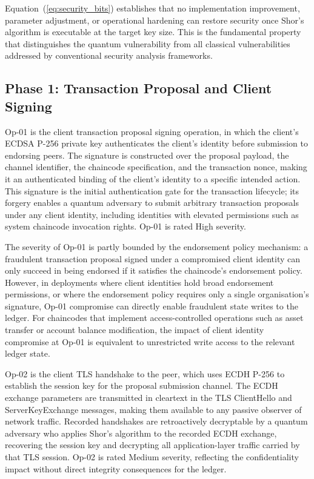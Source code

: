 \documentclass[conference]{IEEEtran}
\begin{document}
Equation~(\ref{eq:security_bits}) establishes that no implementation improvement,
parameter adjustment, or operational hardening can restore security once
Shor's algorithm is executable at the target key size. This is the fundamental
property that distinguishes the quantum vulnerability from all classical
vulnerabilities addressed by conventional security analysis frameworks.

\subsection{Phase 1: Transaction Proposal and Client Signing}

Op-01 is the client transaction proposal signing operation, in which
the client's ECDSA P-256 private key authenticates the client's identity
before submission to endorsing peers. The signature is constructed over
the proposal payload, the channel identifier, the chaincode specification,
and the transaction nonce, making it an authenticated binding of the
client's identity to a specific intended action. This signature is the
initial authentication gate for the transaction lifecycle; its forgery
enables a quantum adversary to submit arbitrary transaction proposals
under any client identity, including identities with elevated permissions
such as system chaincode invocation rights. Op-01 is rated High severity.

The severity of Op-01 is partly bounded by the endorsement policy
mechanism: a fraudulent transaction proposal signed under a compromised
client identity can only succeed in being endorsed if it satisfies the
chaincode's endorsement policy. However, in deployments where client
identities hold broad endorsement permissions, or where the endorsement
policy requires only a single organisation's signature, Op-01 compromise
can directly enable fraudulent state writes to the ledger. For chaincodes
that implement access-controlled operations such as asset transfer or
account balance modification, the impact of client identity compromise
at Op-01 is equivalent to unrestricted write access to the relevant ledger
state.

Op-02 is the client TLS handshake to the peer, which uses ECDH P-256 to
establish the session key for the proposal submission channel. The ECDH
exchange parameters are transmitted in cleartext in the TLS ClientHello
and ServerKeyExchange messages, making them available to any passive
observer of network traffic. Recorded handshakes are retroactively
decryptable by a quantum adversary who applies Shor's algorithm to the
recorded ECDH exchange, recovering the session key and decrypting all
application-layer traffic carried by that TLS session. Op-02 is rated
Medium severity, reflecting the confidentiality impact without direct
integrity consequences for the ledger.
\end{document}
